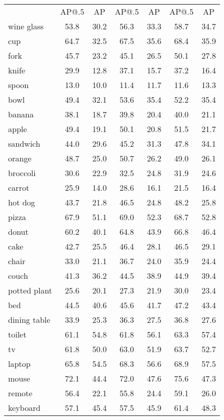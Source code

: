 \begin{table*}[h!]
{\begin{tabular}{@{}
L{1.7cm} 
!{\color{gray}\vrule} cc
!{\color{gray}\vrule} cc
!{\color{gray}\vrule} cc
@{}}
& \scriptsize AP@.5 & \scriptsize AP &  \scriptsize AP@.5 & \scriptsize AP & \scriptsize AP@.5 & \scriptsize AP \\ 
\Xhline{0.5pt}
wine glass & 53.8 & 30.2 & 56.3 & 33.3 & 58.7 & 34.7 \\
cup & 64.7 & 32.5 & 67.5 & 35.6 & 68.4 & 35.9 \\
fork & 45.7 & 23.2 & 45.1 & 26.5 & 50.1 & 27.8 \\
knife & 29.9 & 12.8 & 37.1 & 15.7 & 37.2 & 16.4 \\
spoon & 13.0 & 10.0 & 11.4 & 11.7 & 11.6 & 13.3 \\
bowl & 49.4 & 32.1 & 53.6 & 35.4 & 52.2 & 35.4 \\
banana & 38.1 & 18.7 & 39.8 & 20.4 & 40.0 & 21.1 \\
apple & 49.4 & 19.1 & 50.1 & 20.8 & 51.5 & 21.7 \\
sandwich & 44.0 & 29.6 & 45.2 & 31.3 & 47.8 & 34.1 \\
orange & 48.7 & 25.0 & 50.7 & 26.2 & 49.0 & 26.1 \\
broccoli & 30.6 & 22.9 & 32.5 & 24.8 & 31.9 & 24.6 \\
carrot & 25.9 & 14.0 & 28.6 & 16.1 & 21.5 & 16.4 \\
hot dog & 43.7 & 21.8 & 46.5 & 24.8 & 48.2 & 25.8 \\
pizza & 67.9 & 51.1 & 69.0 & 52.3 & 68.7 & 52.8 \\
donut & 60.2 & 40.1 & 64.8 & 43.9 & 66.8 & 46.4 \\
cake & 42.7 & 25.5 & 46.4 & 28.1 & 46.5 & 29.1 \\
chair & 33.0 & 21.1 & 36.7 & 24.0 & 35.9 & 24.4 \\
couch & 41.3 & 36.2 & 44.5 & 38.9 & 44.9 & 39.4 \\
potted plant & 25.6 & 20.1 & 27.3 & 21.9 & 30.0 & 23.4 \\
bed & 44.5 & 40.6 & 45.6 & 41.7 & 47.2 & 43.4 \\
dining table & 33.9 & 25.3 & 36.3 & 27.5 & 36.8 & 27.6 \\
toilet & 61.1 & 54.8 & 61.8 & 56.1 & 63.3 & 57.4 \\
tv & 61.8 & 50.0 & 63.0 & 51.9 & 63.7 & 52.7 \\
laptop & 65.8 & 54.5 & 68.3 & 56.6 & 68.9 & 57.5 \\
mouse & 72.1 & 44.4 & 72.0 & 47.6 & 75.6 & 47.3 \\
remote & 56.4 & 22.1 & 55.8 & 24.4 & 59.1 & 26.0 \\
keyboard & 57.1 & 45.4 & 57.5 & 45.9 & 61.4 & 48.3 \\

\end{tabular}}
\end{table*}
